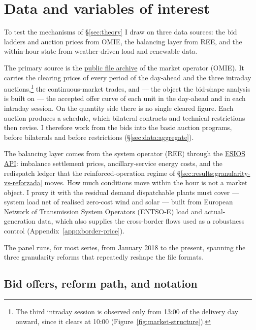 \documentclass[11pt,a4paper]{article}
\theoremstyle{definition}
\theoremstyle{remark}
\theoremstyle{plain}
\begin{document}
\section{Data and variables of interest}\label{sec:data}

To test the mechanisms of \S\ref{sec:theory} I draw on three data sources: the bid ladders and auction prices from OMIE, the balancing layer from REE, and the within-hour state from weather-driven load and renewable data.

The primary source is the \href{https://www.omie.es/es/file-access-list}{public file archive} of the market operator (OMIE). It carries the clearing prices of every period of the day-ahead and the three intraday auctions,\footnote{The third intraday session is observed only from 13:00 of the delivery day onward, since it clears at 10:00 (Figure~\ref{fig:market-structure}).} the continuous-market trades, and --- the object the bid-shape analysis is built on --- the accepted offer curve of each unit in the day-ahead and in each intraday session. On the quantity side there is no single cleared figure. Each auction produces a schedule, which bilateral contracts and technical restrictions then revise. I therefore work from the bids into the basic auction programs, before bilaterals and before restrictions (\S\ref{sec:data:aggregate}).

The balancing layer comes from the system operator (REE) through the \href{https://www.esios.ree.es/es/pagina/api}{ESIOS API}: imbalance settlement prices, ancillary-service energy costs, and the redispatch ledger that the reinforced-operation regime of \S\ref{sec:results:granularity-vs-reforzada} moves. How much conditions move within the hour is not a market object. I proxy it with the residual demand dispatchable plants must cover --- system load net of realised zero-cost wind and solar --- built from European Network of Transmission System Operators (ENTSO-E) load and actual-generation data, which also supplies the cross-border flows used as a robustness control (Appendix~\ref{app:xborder-price}).

The panel runs, for most series, from January 2018 to the present, spanning the three granularity reforms that repeatedly reshape the file formats.


\subsection{Bid offers, reform path, and notation}\label{sec:data:outcomes}
\end{document}
